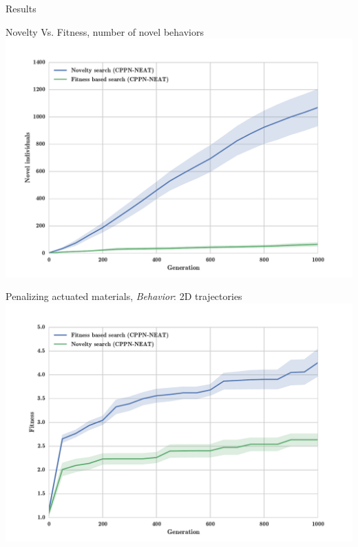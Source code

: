 \documentclass{beamer}
\begin{document}
\begin{frame}[allowframebreaks]{Results}
\begin{minipage}{\textwidth}
\begin{block}{Novelty Vs. Fitness, number of novel behaviors}
\includegraphics[width=1.0\textwidth]{figures/results/novelIndividualsFitNovComp.pdf}
\end{block}
\end{minipage}

\begin{minipage}{\textwidth}
\begin{block}{Penalizing actuated materials, \textit{Behavior}: 2D trajectories}
\includegraphics[width=1.0\textwidth]{figures/results/FitNovSize5Pen2.pdf}
\end{block}
\end{minipage}


\end{frame}
\end{document}
